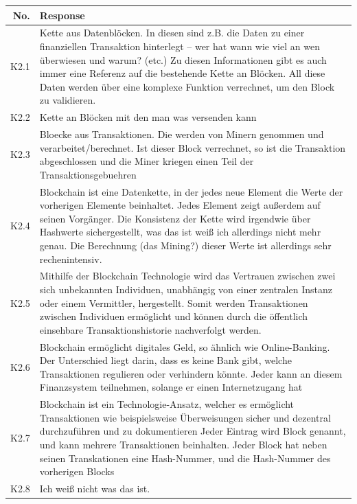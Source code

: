 \begin{table}[H]
    \centering
    \begin{tabularx}{\textwidth}{r|X}
        No. & Response \\ \hline
         K2.1 & Kette aus Datenblöcken. In diesen sind z.B. die Daten zu einer finanziellen Transaktion hinterlegt – wer hat wann wie viel an wen überwiesen und warum? (etc.) Zu diesen Informationen gibt es auch immer eine Referenz auf die bestehende Kette an Blöcken. All diese Daten werden über eine komplexe Funktion verrechnet, um den Block zu validieren. \\
         K2.2 & Kette an Blöcken mit den man was versenden kann \\
         K2.3 & Bloecke aus Transaktionen. Die werden von Minern genommen und verarbeitet/berechnet. Ist dieser Block verrechnet, so ist die Transaktion abgeschlossen und die Miner kriegen einen Teil der Transaktionsgebuehren \\
         K2.4 & Blockchain ist eine Datenkette, in der jedes neue Element die Werte der vorherigen Elemente beinhaltet. Jedes Element zeigt außerdem auf seinen Vorgänger. Die Konsistenz der Kette wird irgendwie über Hashwerte sichergestellt, was das ist weiß ich allerdings nicht mehr genau. Die Berechnung (das Mining?) dieser Werte ist allerdings sehr rechenintensiv. \\
         K2.5 & Mithilfe der Blockchain Technologie wird das Vertrauen zwischen zwei sich unbekannten Individuen, unabhängig von einer zentralen Instanz oder einem Vermittler, hergestellt. Somit werden Transaktionen zwischen Individuen ermöglicht und können durch die öffentlich einsehbare Transaktionshistorie nachverfolgt werden. \\
         K2.6 & Blockchain ermöglicht digitales Geld, so ähnlich wie Online-Banking. Der Unterschied liegt darin, dass es keine Bank gibt, welche Transaktionen regulieren oder verhindern könnte. Jeder kann an diesem Finanzsystem teilnehmen, solange er einen Internetzugang hat \\
         K2.7 & Blockchain ist ein Technologie-Ansatz, welcher es ermöglicht Transaktionen wie beispielsweise Überweisungen sicher und dezentral durchzuführen und zu dokumentieren  Jeder Eintrag wird Block genannt, und kann mehrere Transaktionen beinhalten. Jeder Block hat neben seinen Transkationen eine Hash-Nummer, und die Hash-Nummer des vorherigen Blocks \\
         K2.8 & Ich weiß nicht was das ist. \\

\end{tabularx}
\end{table}
